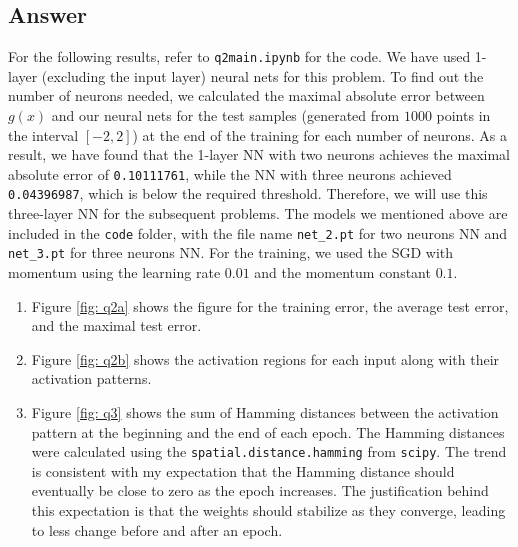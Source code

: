 \documentclass[
	12pt, %
]{../Template/fphw}
\begin{document}

\subsection*{Answer}
For the following results, refer to \verb|q2main.ipynb| for the code. We have used 1-layer (excluding the input layer) neural nets for this problem. To find out the number of neurons needed, we calculated the maximal absolute error between $g(x)$ and our neural nets for the test samples (generated from $1000$ points in the interval $[-2,2]$) at the end of the training for each number of neurons. As a result, we have found that the 1-layer NN with two neurons achieves the maximal absolute error of \verb|0.10111761|, while the NN with three neurons achieved \verb|0.04396987|, which is below the required threshold. Therefore, we will use this three-layer NN for the subsequent problems. The models we mentioned above are included in the \verb|code| folder, with the file name \verb|net_2.pt| for two neurons NN and \verb|net_3.pt| for three neurons NN. For the training, we used the SGD with momentum using the learning rate $0.01$ and the momentum constant $0.1$.

\begin{enumerate}[label = (\alph*)]
	\item Figure \ref{fig: q2a} shows the figure for the training error, the average test error, and the maximal test error. 
    \item Figure \ref{fig: q2b} shows the activation regions for each input along with their activation patterns.
    \item Figure \ref{fig: q3} shows the sum of Hamming distances between the activation pattern at the beginning and the end of each epoch. The Hamming distances were calculated using the \verb|spatial.distance.hamming| from \verb|scipy|. The trend is consistent with my expectation that the Hamming distance should eventually be close to zero as the epoch increases. The justification behind this expectation is that the weights should stabilize as they converge, leading to less change before and after an epoch.
\end{enumerate}
\end{document}
